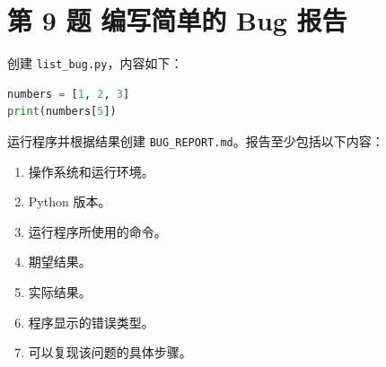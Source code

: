 \documentclass[a4paper,12pt]{report}
\begin{document}
\section{第 9 题 编写简单的 Bug 报告}


创建 \texttt{list\_bug.py}，内容如下：

\begin{lstlisting}[language=Python]
numbers = [1, 2, 3]
print(numbers[5])
\end{lstlisting}

运行程序并根据结果创建 \texttt{BUG\_REPORT.md}。报告至少包括以下内容：

\begin{enumerate}
  \item 操作系统和运行环境。
  \item Python 版本。
  \item 运行程序所使用的命令。
  \item 期望结果。
  \item 实际结果。
  \item 程序显示的错误类型。
  \item 可以复现该问题的具体步骤。
\end{enumerate}

\end{document}
